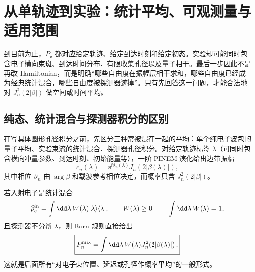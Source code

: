 \chapter{从单轨迹到实验：统计平均、可观测量与适用范围}
\label{chap:observables}

到目前为止，$P_n$ 都对应给定轨迹、给定到达时刻和给定初态。实验却可能同时包含电子横向束斑、到达时间分布、有限收集孔径以及量子相干。最后一步因此不是再改 Hamiltonian，而是明确“哪些自由度在振幅层相干求和，哪些自由度已经成为经典统计混合，哪些自由度被探测器迹掉”。只有先回答这一问题，才能合法地对 $J_n^2(2|\beta|)$ 做空间或时间平均。

\section{纯态、统计混合与探测器积分的区别}

在写具体圆形孔径积分之前，先区分三种常被混在一起的平均：单个纯电子波包的量子平均、实验束流的统计混合、探测器孔径积分。对给定轨迹标签 $\lambda$（可同时包含横向冲量参数、到达时刻、初始能量等），一阶 PINEM 演化给出边带振幅
\begin{equation}
 c_n(\lambda)
 =\ee^{\ii\vartheta_n(\lambda)}
 J_n\!\left(2|\beta(\lambda)|\right),
 \label{eq:general-trajectory-sideband-amplitude}
\end{equation}
其中相位 $\vartheta_n$ 由 $\arg\beta$ 和载波参考相位决定，而概率只含
$J_n^2(2|\beta|)$。

若入射电子是统计混合
\begin{equation}
 \widehat\rho_{\rm e}^{\rm in}
 =\int\dd\lambda\,W(\lambda)
 |\lambda\rangle\langle\lambda|,
 \qquad
 W(\lambda)\ge0,
 \qquad
 \int\dd\lambda\,W(\lambda)=1,
 \label{eq:electron-incoherent-mixture}
\end{equation}
且探测器不分辨 $\lambda$，则 Born 规则直接给出
\begin{equation}
 \boxed{
 P_n^{\rm mix}
 =\int\dd\lambda\,W(\lambda)
 J_n^2\!\left(2|\beta(\lambda)|\right).}
 \label{eq:general-incoherent-average}
\end{equation}
这就是后面所有“对电子束位置、延迟或孔径作概率平均”的一般形式。

